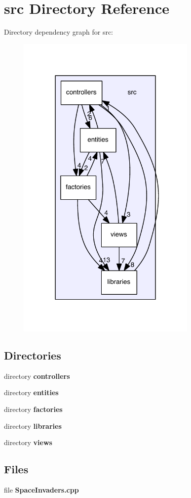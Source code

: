 \section{src Directory Reference}
\label{dir_68267d1309a1af8e8297ef4c3efbcdba}
Directory dependency graph for src\-:\nopagebreak
\begin{figure}[H]
\begin{center}
\leavevmode
\includegraphics[width=248pt]{dir_68267d1309a1af8e8297ef4c3efbcdba_dep}
\end{center}
\end{figure}
\subsection*{Directories}
\begin{DoxyCompactItemize}
\item 
directory {\bf controllers}
\item 
directory {\bf entities}
\item 
directory {\bf factories}
\item 
directory {\bf libraries}
\item 
directory {\bf views}
\end{DoxyCompactItemize}
\subsection*{Files}
\begin{DoxyCompactItemize}
\item 
file {\bf Space\-Invaders.\-cpp}
\end{DoxyCompactItemize}
